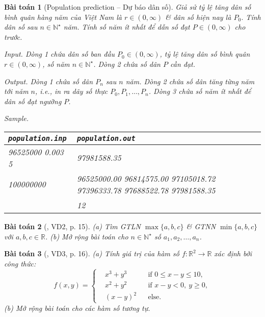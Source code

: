 \documentclass{article}
\newtheorem{baitoan}{Bài toán}
\begin{document}
\begin{baitoan}[Population prediction -- Dự báo dân số]
	Giả sử tỷ lệ tăng dân số bình quân hàng năm của Việt Nam là $r\in(0,\infty)$ \& dân số hiện nay là $P_0$. Tính dân số sau $n\in\mathbb{N}^\star$ năm. Tính số năm ít nhất để dẫn số đạt $P\in(0,\infty)$ cho trước.
	\item {\sf Input.} Dòng 1 chứa dân số ban đầu $P_0\in(0,\infty)$, tỷ lệ tăng dân số bình quân $r\in(0,\infty)$, số năm $n\in\mathbb{N}^\star$. Dòng 2 chứa số dân $P$ cần đạt.
	\item {\sf Output.} Dòng 1 chứa số dân $P_n$ sau $n$ năm. Dòng 2 chứa số dân tăng từng năm tới năm $n$, i.e., in ra dãy số thực $P_0,P_1,\ldots,P_n$. Dòng 3 chứa số năm ít nhất để dân số đạt ngưỡng $P$.
	\item {\sf Sample.}
	\begin{table}[H]
		\centering
		\begin{tabular}{|l|l|}
			\hline
			{\tt population.inp} & {\tt population.out} \\
			\hline
			96525000 0.003 5 & 97981588.35 \\
			100000000 & 96525000.00 96814575.00 97105018.72 97396333.78 97688522.78 97981588.35 \\
			& 12 \\
			\hline
		\end{tabular}
	\end{table}	
\end{baitoan}

\begin{baitoan}[\cite{Doanh_Tuan_Pascal}, VD2, p. 15]
	(a) Tìm {\rm GTLN} $\max\{a,b,c\}$ \& {\rm GTNN} $\min\{a,b,c\}$ với $a,b,c\in\mathbb{R}$. (b) Mở rộng bài toán cho $n\in\mathbb{N}^\star$ số $a_1,a_2,\ldots,a_n$.
\end{baitoan}

\begin{baitoan}[\cite{Doanh_Tuan_Pascal}, VD3, p. 16]
	(a) Tính giá trị của hàm số $f:\mathbb{R}^2\to\mathbb{R}$ xác định bởi công thức:
	\begin{equation*}
		f(x,y) = \left\{\begin{split}
			&x^3 + y^3&&\mbox{if }0\le x - y\le10,\\
			&x^2 + y^2&&\mbox{if } x - y < 0,\ y\ge0,\\
			&(x - y)^2&&\mbox{else}.
		\end{split}\right.
	\end{equation*}
	(b) Mở rộng bài toán cho các hàm số tương tự.
\end{baitoan}
\end{document}
